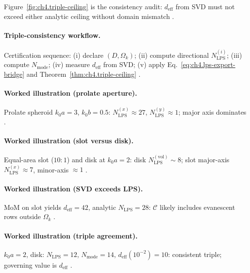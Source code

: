 Figure~\ref{fig:ch4.triple-ceiling} is the consistency audit: \(d_{\mathrm{eff}}\) from SVD must not exceed either analytic ceiling without domain
mismatch \cite{hansen1988,harrington2001,stratton1941,devaney2004}.

\paragraph{Triple-consistency workflow.}
Certification sequence: (i) declare \((D,\Omega_{k})\); (ii) compute directional \(N_{\mathrm{LPS}}^{(i)}\); (iii) compute \(N_{\mathrm{mode}}\);
(iv) measure \(d_{\mathrm{eff}}\) from SVD; (v) apply Eq.~\eqref{eq:ch4.lps-export-bridge} and Theorem~\ref{thm:ch4.triple-ceiling}
\cite{hansen1988,harrington2001,devaney2004,stratton1941}.

\paragraph{Worked illustration (prolate aperture).}
Prolate spheroid \(k_{0}a=3\), \(k_{0}b=0.5\): \(N_{\mathrm{LPS}}^{(x)}\approx27\), \(N_{\mathrm{LPS}}^{(y)}\approx1\); major axis dominates
\cite{hansen1988,jackson1999,harrington2001,collin2001}.

\paragraph{Worked illustration (slot versus disk).}
Equal-area slot (\(10:1\)) and disk at \(k_{0}a=2\): disk \(N_{\mathrm{LPS}}^{(\mathrm{vol})}\sim8\); slot major-axis \(N_{\mathrm{LPS}}^{(x)}\approx7\),
minor-axis \(\approx1\) \cite{hansen1988,collin2001,stratton1941}.

\paragraph{Worked illustration (SVD exceeds LPS).}
MoM on slot yields \(d_{\mathrm{eff}}=42\), analytic \(N_{\mathrm{LPS}}=28\): \(\mathcal{C}\) likely includes evanescent rows outside \(\Omega_{k}\)
\cite{harrington2001,devaney2004,hansen1988,stratton1941}.

\paragraph{Worked illustration (triple agreement).}
\(k_{0}a=2\), disk: \(N_{\mathrm{LPS}}=12\), \(N_{\mathrm{mode}}=14\), \(d_{\mathrm{eff}}(10^{-2})=10\): consistent triple; governing value is
\(d_{\mathrm{eff}}\) \cite{hansen1988,harrington2001,jackson1999}.

